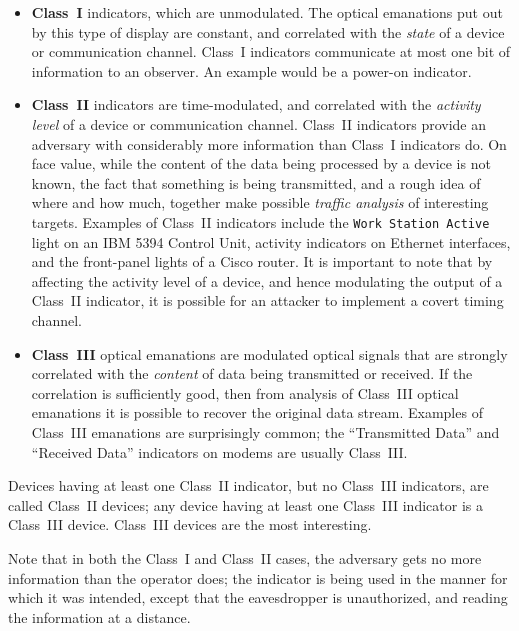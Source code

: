 \documentclass{acmtrans2e}
\begin{document}
\begin{itemize}

\item{\bf Class~I} indicators, which are unmodulated.  The
optical emanations put out by this type of display are constant, and
correlated with the {\it state} of a device
or communication channel.  Class~I indicators communicate at most one bit 
of information to an observer.  An example would be a power-on indicator.

\item {\bf Class~II} indicators are time-modulated, and correlated with
the {\it activity level} of a device or communication 
channel.  Class~II indicators provide an adversary with considerably 
more information than Class~I indicators do.  On face value, while the
content of the
data being processed by a device is not known, the fact that something is
being transmitted, and a  rough idea of where and how much, together
make possible {\it traffic analysis} of interesting targets.  Examples
of Class~II indicators include the {\tt Work Station Active} light on
an IBM 5394 Control Unit, activity indicators on Ethernet interfaces, and the
front-panel lights of a Cisco router.  It is important to note
that by affecting the activity level of a device, and hence modulating
the output of a Class~II indicator, it is possible for an attacker to
implement a covert timing channel.

\item {\bf Class~III} optical emanations are modulated optical
signals that are strongly 
correlated with the {\it content} of data being transmitted or received.  
If the correlation is sufficiently good, then from analysis of Class~III 
optical emanations it is possible to recover the original data stream. 
Examples of Class~III emanations are surprisingly common; the 
``Transmitted Data'' and ``Received Data'' indicators on modems
are usually Class~III.

\end{itemize}

Devices having at least one Class~II 
indicator, but no Class~III indicators, are called Class~II devices; 
any device having at least one Class~III indicator is a Class~III 
device.  Class~III devices are the most interesting.

Note that in both the Class~I and Class~II cases, the adversary gets no more 
information than the operator does; the indicator is being used in the 
manner for which it was intended, except that the eavesdropper is 
unauthorized, and reading the information at a distance.
\end{document}
